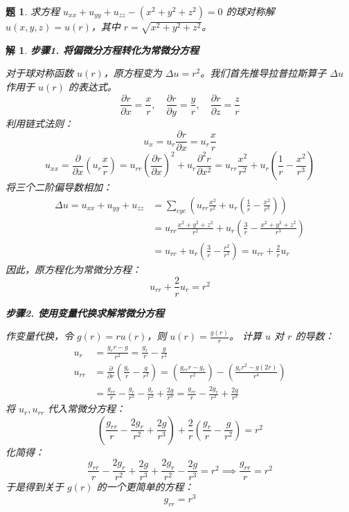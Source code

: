 \documentclass[12pt,a4paper]{article}
\newtheorem{problem}{题}
\newtheorem*{solution}{解}
\begin{document}
	\begin{problem}
		求方程 $u_{xx}+u_{yy}+u_{zz} - (x^2+y^2+z^2) = 0$ 的球对称解 $u(x,y,z)=u(r)$，其中 $r=\sqrt{x^2+y^2+z^2}$。
	\end{problem}
	\hrulefill
	\begin{solution}
		\textbf{步骤1. 将偏微分方程转化为常微分方程}
		
		\noindent
		对于球对称函数 $u(r)$，原方程变为 $\Delta u = r^2$。我们首先推导拉普拉斯算子 $\Delta u$ 作用于 $u(r)$ 的表达式。
		\[
		\frac{\partial r}{\partial x} = \frac{x}{r}, \quad \frac{\partial r}{\partial y} = \frac{y}{r}, \quad \frac{\partial r}{\partial z} = \frac{z}{r}
		\]
		利用链式法则：
		\[
		u_x = u_r \frac{\partial r}{\partial x} = u_r \frac{x}{r}
		\]
		\[
		u_{xx} = \frac{\partial}{\partial x}\left(u_r \frac{x}{r}\right) = u_{rr}\left(\frac{\partial r}{\partial x}\right)^2 + u_r \frac{\partial^2 r}{\partial x^2} = u_{rr}\frac{x^2}{r^2} + u_r\left(\frac{1}{r} - \frac{x^2}{r^3}\right)
		\]
		将三个二阶偏导数相加：
		\begin{align*}
			\Delta u = u_{xx}+u_{yy}+u_{zz} &= \sum_{cyc} \left( u_{rr}\frac{x^2}{r^2} + u_r\left(\frac{1}{r} - \frac{x^2}{r^3}\right) \right) \\
			&= u_{rr} \frac{x^2+y^2+z^2}{r^2} + u_r \left(\frac{3}{r} - \frac{x^2+y^2+z^2}{r^3}\right) \\
			&= u_{rr} + u_r \left(\frac{3}{r} - \frac{r^2}{r^3}\right) = u_{rr} + \frac{2}{r}u_r
		\end{align*}
		因此，原方程化为常微分方程：
		\[
		u_{rr} + \frac{2}{r}u_r = r^2
		\]
		
		\hrulefill
		
		\textbf{步骤2. 使用变量代换求解常微分方程}
		
		\noindent
		作变量代换，令 $g(r) = r u(r)$，则 $u(r) = \frac{g(r)}{r}$。
		计算 $u$ 对 $r$ 的导数：
		\begin{align*}
			u_r &= \frac{g_r r - g}{r^2} = \frac{g_r}{r} - \frac{g}{r^2} \\[6pt]
			u_{rr} &= \frac{\partial}{\partial r}\left(\frac{g_r}{r} - \frac{g}{r^2}\right) = \left(\frac{g_{rr}r - g_r}{r^2}\right) - \left(\frac{g_r r^2 - g(2r)}{r^4}\right) \\
			&= \frac{g_{rr}}{r} - \frac{g_r}{r^2} - \frac{g_r}{r^2} + \frac{2g}{r^3} = \frac{g_{rr}}{r} - \frac{2g_r}{r^2} + \frac{2g}{r^3}
		\end{align*}
		将 $u_r, u_{rr}$ 代入常微分方程：
		\[
		\left( \frac{g_{rr}}{r} - \frac{2g_r}{r^2} + \frac{2g}{r^3} \right) + \frac{2}{r} \left( \frac{g_r}{r} - \frac{g}{r^2} \right) = r^2
		\]
		化简得：
		\[
		\frac{g_{rr}}{r} - \frac{2g_r}{r^2} + \frac{2g}{r^3} + \frac{2g_r}{r^2} - \frac{2g}{r^3} = r^2 \implies \frac{g_{rr}}{r} = r^2
		\]
		于是得到关于 $g(r)$ 的一个更简单的方程：
		\[
		g_{rr} = r^3
		\]
		

\end{solution}
\end{document}
